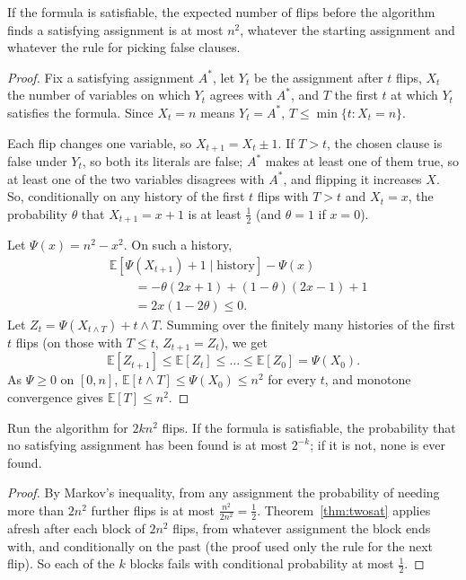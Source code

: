 \begin{theorem}[Papadimitriou]\label{thm:twosat}
If the formula is satisfiable, the expected number of flips before the algorithm finds a satisfying assignment is
at most $n^2$, whatever the starting assignment and whatever the rule for picking false clauses.
\end{theorem}
\begin{proof}
Fix a satisfying assignment $A^*$, let $Y_t$ be the assignment after $t$ flips, $X_t$ the number of variables on which $Y_t$ agrees with $A^*$,
and $T$ the first $t$ at which $Y_t$ satisfies the formula. Since $X_t=n$ means $Y_t=A^*$, $T\le\min\{t:X_t=n\}$.

Each flip changes one variable, so $X_{t+1}=X_t\pm1$. If $T>t$, the chosen clause is false under $Y_t$, so both its literals are false; $A^*$
makes at least one of them true, so at least one of the two variables disagrees with $A^*$, and flipping it increases $X$. So,
conditionally on any history of the first $t$ flips with $T>t$ and $X_t=x$, the probability $\theta$ that $X_{t+1}=x+1$ is at least $\frac12$ (and $\theta=1$
if $x=0$).

Let $\Psi(x)=n^2-x^2$. On such a history,
\[
\begin{aligned}&\mathbb E[\Psi(X_{t+1})+1\mid\text{history}]-\Psi(x)\\&\qquad=-\theta(2x+1)+(1-\theta)(2x-1)+1\\&\qquad=2x(1-2\theta)\le0.\end{aligned}
\]
Let $Z_t=\Psi(X_{t\wedge T})+t\wedge T$. Summing over the finitely many histories of the first $t$ flips (on those with $T\le t$, $Z_{t+1}=Z_t$), we get
\[
\mathbb E[Z_{t+1}]\le\mathbb E[Z_t]\le\dots\le\mathbb E[Z_0]=\Psi(X_0).
\]
As $\Psi\ge0$ on $[0,n]$, $\mathbb E[t\wedge T]\le\Psi(X_0)\le n^2$ for every $t$, and monotone convergence gives $\mathbb E[T]\le n^2$.
\end{proof}

\begin{corollary}\label{cor:twosat}
Run the algorithm for $2kn^2$ flips. If the formula is satisfiable, the probability that no satisfying assignment has been
found is at most $2^{-k}$; if it is not, none is ever found.
\end{corollary}
\begin{proof}
By Markov's inequality, from any assignment the probability of needing more than $2n^2$ further flips is at most
$\frac{n^2}{2n^2}=\frac12$. Theorem~\ref{thm:twosat} applies afresh after each block of $2n^2$ flips, from whatever assignment the block ends with, and
conditionally on the past (the proof used only the rule for the next flip). So each of the $k$ blocks fails with
conditional probability at most $\frac12$.
\end{proof}

